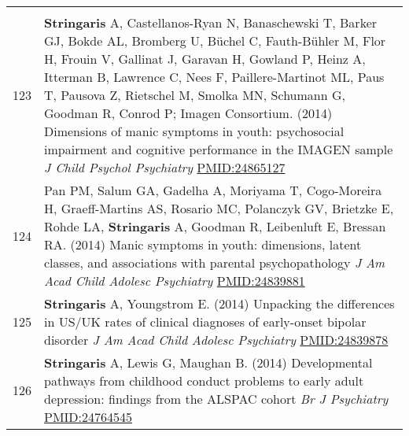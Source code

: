 \documentclass[
]{article}
\begin{document}
\begin{longtable}[]{@{}ll@{}}
\begin{minipage}[t]{0.94\columnwidth}
\end{minipage}\tabularnewline
\begin{minipage}[t]{0.01\columnwidth}\raggedright
123\strut
\end{minipage} & \begin{minipage}[t]{0.94\columnwidth}\raggedright
\textbf{Stringaris} A, Castellanos-Ryan N, Banaschewski T, Barker GJ,
Bokde AL, Bromberg U, Büchel C, Fauth-Bühler M, Flor H, Frouin V,
Gallinat J, Garavan H, Gowland P, Heinz A, Itterman B, Lawrence C, Nees
F, Paillere-Martinot ML, Paus T, Pausova Z, Rietschel M, Smolka MN,
Schumann G, Goodman R, Conrod P; Imagen Consortium. (2014) Dimensions of
manic symptoms in youth: psychosocial impairment and cognitive
performance in the IMAGEN sample \emph{J Child Psychol Psychiatry}
\url{PMID:24865127}\strut
\end{minipage}\tabularnewline
\begin{minipage}[t]{0.01\columnwidth}\raggedright
124\strut
\end{minipage} & \begin{minipage}[t]{0.94\columnwidth}\raggedright
Pan PM, Salum GA, Gadelha A, Moriyama T, Cogo-Moreira H, Graeff-Martins
AS, Rosario MC, Polanczyk GV, Brietzke E, Rohde LA, \textbf{Stringaris}
A, Goodman R, Leibenluft E, Bressan RA. (2014) Manic symptoms in youth:
dimensions, latent classes, and associations with parental
psychopathology \emph{J Am Acad Child Adolesc Psychiatry}
\url{PMID:24839881}\strut
\end{minipage}\tabularnewline
\begin{minipage}[t]{0.01\columnwidth}\raggedright
125\strut
\end{minipage} & \begin{minipage}[t]{0.94\columnwidth}\raggedright
\textbf{Stringaris} A, Youngstrom E. (2014) Unpacking the differences in
US/UK rates of clinical diagnoses of early-onset bipolar disorder
\emph{J Am Acad Child Adolesc Psychiatry} \url{PMID:24839878}\strut
\end{minipage}\tabularnewline
\begin{minipage}[t]{0.01\columnwidth}\raggedright
126\strut
\end{minipage} & \begin{minipage}[t]{0.94\columnwidth}\raggedright
\textbf{Stringaris} A, Lewis G, Maughan B. (2014) Developmental pathways
from childhood conduct problems to early adult depression: findings from
the ALSPAC cohort \emph{Br J Psychiatry} \url{PMID:24764545}\strut
\end{minipage}\tabularnewline

\end{longtable}
\end{document}

